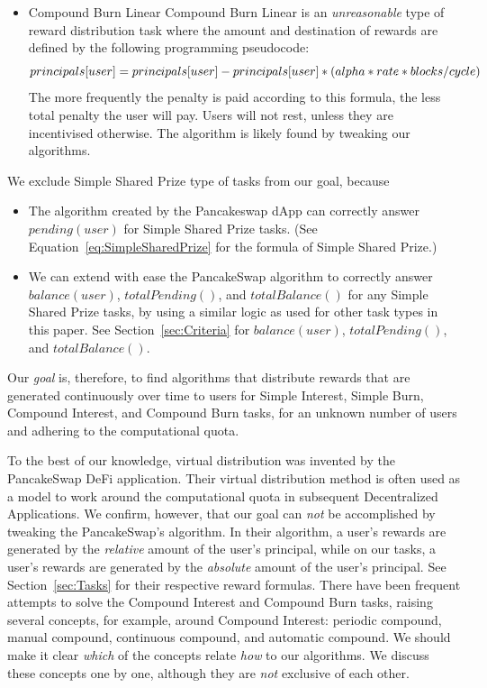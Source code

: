 \documentclass{article}
\begin{document}
\begin{itemize}
  \item Compound Burn Linear \newline
  \label{sec:CompoundBurnLinear}
  Compound Burn Linear is an \textit{unreasonable} type of reward distribution task 
  where the amount and destination of rewards are defined by the following programming 
  pseudocode:  
  \begin{equation} \label{eq:SimpCompoundBurnLinearleInterest}
    \\principals[user] = principals[user] - principals[user] * (alpha * rate * blocks/cycle)
  \end{equation}
  The more frequently the penalty is paid according to this formula, 
  the less total penalty the user will pay. Users will not rest, unless they are incentivised otherwise.
  The algorithm is likely found by tweaking our algorithms.
\end{itemize}

We exclude Simple Shared Prize type of tasks from our goal, because 
\begin{itemize}
  \item The algorithm created by the Pancakeswap dApp can correctly answer 
  $pending(user)$ for Simple Shared Prize tasks.
  (See Equation~\ref{eq:SimpleSharedPrize} for the formula of Simple Shared Prize.)
  \item We can extend with ease the PancakeSwap algorithm to correctly answer $balance(user)$, 
  $totalPending()$, and $totalBalance()$ for any Simple Shared Prize tasks, 
  by using a similar logic as used for other task types in this paper.
  See Section~\ref{sec:Criteria} for $balance(user)$, $totalPending()$, 
  and $totalBalance()$.
\end{itemize}

Our \textit{goal} is, therefore, to find algorithms that distribute rewards 
that are generated continuously over time to users for Simple Interest, Simple Burn, 
Compound Interest, and Compound Burn tasks, for an unknown number of users and 
adhering to the computational quota.

To the best of our knowledge, virtual distribution was invented by the PancakeSwap 
DeFi application.
Their virtual distribution method is often used as a model to work around the computational 
quota in subsequent Decentralized Applications.
We confirm, however, that our goal can \textit{not} be accomplished by tweaking the 
PancakeSwap’s algorithm.
In their algorithm, a user's rewards are generated by 
the \textit{relative} amount of the user's principal, while on our tasks, 
a user's rewards are generated by the \textit{absolute} amount of the user's principal. 
See Section~\ref{sec:Tasks} for their respective reward formulas.
There have been frequent attempts to solve the Compound Interest and Compound Burn 
tasks, raising several concepts, for example, around Compound Interest: 
periodic compound, manual compound, continuous compound, and automatic compound.
We should make it clear \textit{which} of the concepts relate \textit{how} to our algorithms.
We discuss these concepts one by one, although they are \textit{not} exclusive of 
each other.
\end{document}
